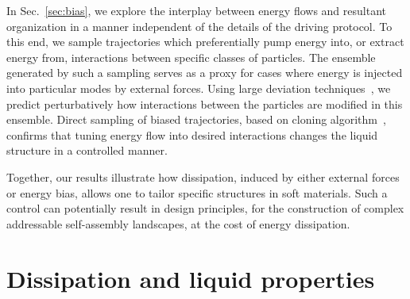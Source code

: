 \documentclass[pre, superscriptaddress, twocolumn,pre]{revtex4-1}
\begin{document}
In Sec.~\ref{sec:bias}, we explore the interplay between energy flows and resultant organization in a manner independent of the details of the driving protocol. To this end, we sample trajectories which preferentially pump energy into, or extract energy from, interactions between specific classes of particles. The ensemble generated by such a sampling serves as a proxy for cases where energy is injected into particular modes by external forces. Using large deviation techniques~\cite{garrahan2007, Hedges2009, Jack2010, Pitard2011, Speck2012, Bodineau2012a, Chetrite2013, Limmer2014, Nemoto2017}, we predict perturbatively how interactions between the particles are modified in this ensemble. Direct sampling of biased trajectories, based on cloning algorithm~\cite{Giadina2006, tailleur2007probing, Hurtado2009, Nemoto2016, Ray2018, Klymko2018, Brewer2018}, confirms that tuning energy flow into desired interactions changes the liquid structure in a controlled manner. 


Together, our results illustrate how dissipation, induced by either external forces or energy bias, allows one to tailor specific structures in soft materials. Such a control can potentially result in design principles, for the construction of complex addressable self-assembly landscapes, at the cost of energy dissipation.




\section{Dissipation and liquid properties}\label{sec:method}
\end{document}

